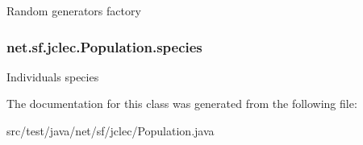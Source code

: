 Random generators factory \hypertarget{classnet_1_1sf_1_1jclec_1_1_population_a82f760cdecd431126c517367c9447cea}{
\subsubsection[{species}]{ net.\-sf.\-jclec.\-Population.\-species\hspace{0.3cm}{\ttfamily [protected]}}}\label{classnet_1_1sf_1_1jclec_1_1_population_a82f760cdecd431126c517367c9447cea}
Individuals species 

The documentation for this class was generated from the following file\-:\begin{DoxyCompactItemize}
\item 
src/test/java/net/sf/jclec/Population.\-java\end{DoxyCompactItemize}
